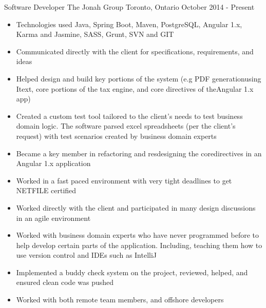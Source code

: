 \begin{cventries}
    \cventry
    {Software Developer}
    {The Jonah Group}
    {Toronto, Ontario}
    {October 2014 - Present}
    {
        \renewcommand{\labelitemii}{\bullet}
        \begin{cvitems}
            \item[] {
                \begin{itemize}
                    \item {Technologies used Java, Spring Boot, Maven, PostgreSQL, Angular 1.x, Karma and Jasmine, SASS, Grunt, SVN and GIT}
                    \item {Communicated directly with the client for specifications, requirements, and ideas}
                    \item {Helped design and build key portions of the system (e.g PDF generationusing Itext, core portions of the tax engine, and core directives of theAngular 1.x app)}
                    \item {Created a custom test tool tailored to the client’s needs to test business domain logic. The software parsed excel spreadsheets
                            (per the client’s request) with test scenarios created by business domain experts}
                    \item {Became a key member in refactoring and resdesigning the coredirectives in an Angular 1.x application}
                    \item {Worked in a fast paced environment with very tight deadlines to get NETFILE certified}
                    \item {Worked directly with the client and participated in many design discussions in an agile environment}
                    \item {Worked with business domain experts who have never programmed before to help develop certain parts of the application. Including, teaching them how to use version control and IDEs such as IntelliJ}
                    \item {Implemented a buddy check system on the project, reviewed, helped, and ensured clean code was pushed}
                    \item {Worked with both remote team members, and offshore developers}
                \end{itemize}
            }
            \item[] {
                \begin{itemize}

\end{itemize}}
\end{cvitems}}
\end{cventries}
